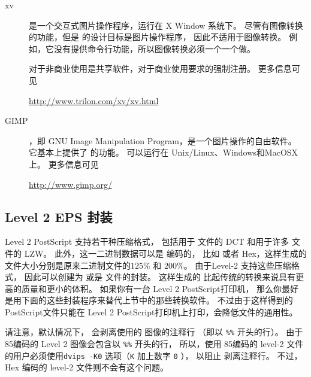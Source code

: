 \begin{description}
	\item[xv]
	
	 是一个交互式图片操作程序，运行在 X Window 系统下。
	尽管有图像转换的功能，但是  的设计目标是图片操作程序，
	因此不适用于图像转换。
	例如，它没有提供命令行功能，所以图像转换必须一个一个做。
	
	 对于非商业使用是共享软件，对于商业使用要求的强制注册。
	更多信息可见
	\begin{center}
		\url{http://www.trilon.com/xv/xv.html}
	\end{center}
	
	\item[GIMP]	
	
	，即 GNU Image Manipulation Program，是一个图片操作的自由软件。
	它基本上提供了   的功能。
	 可以运行在 Unix/Linux、Windows和MacOSX上。
	更多信息可见
	\begin{center}
		\url{http://www.gimp.org/}
	\end{center}

\end{description}


\subsection{Level 2 EPS 封装}\label{ssec:epswrapper}
Level 2 PostScript 支持若干种压缩格式，
包括用于  文件的 DCT 和用于许多  文件的 LZW。
此外，这一二进制数据可以是 \ascii 编码的，
比如  或者 \ascii Hex，这样生成的\ascii 文件大小分别是原来二进制文件的$125\percent$ 和 $200\percent$。
由于Level-2 支持这些压缩格式，
因此可以创建为  或是  文件的封装。
这样生成的  比起传统的转换来说具有更高的质量和更小的体积。
如果你有一台 Level 2 PostScript打印机，
那么你最好是用下面的这些封装程序来替代上节中的那些转换软件。
不过由于这样得到的PostScript文件只能在 Level 2 PostScript打印机上打印，会降低文件的通用性。

请注意，默认情况下， 会剥离使用的  图像的注释行
（即以 \texttt{\%\%} 开头的行）。
由于\ascii85编码的 Level 2 图像会包含以 \texttt{\%\%} 开头的行，
所以，使用 \ascii85编码的 level-2  文件的用户必须使用\verb|dvips -K0| 选项（\texttt{K} 加上数字 \texttt{0} ），
以阻止  剥离注释行。
不过，\ascii Hex 编码的 level-2 文件则不会有这个问题。

